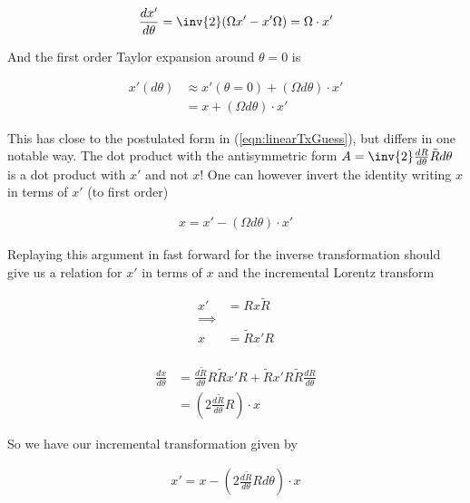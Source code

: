 \begin{align*}
\frac{dx'}{d\theta} = \inv{2}(\Omega x' - x' \Omega) = \Omega \cdot x'
\end{align*}

And the first order Taylor expansion around $\theta =0$ is

\begin{align*}
x'(d\theta) 
&\approx x'(\theta = 0) + ( \Omega d\theta ) \cdot x' \\
&= x + ( \Omega d\theta ) \cdot x'
\end{align*}

This has close to the postulated form in (\ref{eqn:linearTxGuess}), but differs in one notable way.  The dot product with the antisymmetric form $A = \inv{2} \frac{dR}{d\theta} \tilde{R} d\theta$ is a dot product with $x'$ and not $x$!  One can however invert the identity writing $x$ in terms of $x'$ (to first order)

\begin{align*}
x = x' - ( \Omega d\theta ) \cdot x'
\end{align*}

Replaying this argument in fast forward for the inverse transformation should give us a relation for $x'$ in terms of $x$ and the incremental Lorentz transform

\begin{align*}
x' &= R x \tilde{R} \\
\implies \\
x &= \tilde{R} x' {R} \\
\end{align*}

\begin{align*}
\frac{dx}{d\theta}
&= \frac{d \tilde{R}}{d\theta} R \tilde{R} x' R + \tilde{R} x' R \tilde{R} \frac{d {R}}{d\theta}  \\
&= \left(2 \frac{d \tilde{R}}{d\theta} R \right) \cdot x
\end{align*}

So we have our incremental transformation given by

\begin{align}\label{eqn:gotcha}
x'= x - \left(2 \frac{d \tilde{R}}{d\theta} R d\theta \right) \cdot x
\end{align}


